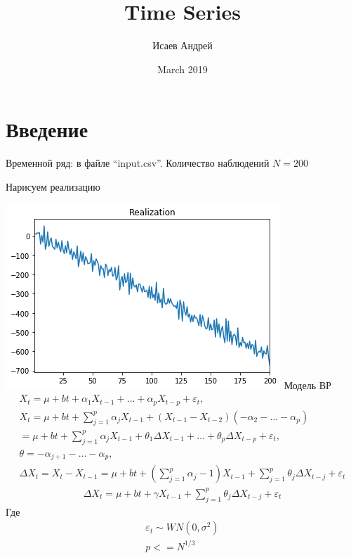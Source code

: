 \documentclass{article}
\title{Time Series}
\author{Исаев Андрей }
\date{March 2019}
\begin{document}
\maketitle

\section{Введение}
Временной ряд: в файле ``input.csv''. Количество наблюдений $N=200$

Нарисуем реализацию

\includegraphics[width=\linewidth]{image.png}
Модель ВР \begin{gather*}
    X_t = \mu + bt +\alpha_1X_{t-1} + \ldots + \alpha_p X_{t-p} + \varepsilon_t,\\
    X_t = \mu +bt +\sum_{j=1}^{p}\alpha_jX_{t-1} + (X_{t-1} - X_{t-2})(-\alpha_2-\ldots -\alpha_p)\\
    = \mu + bt +\sum_{j=1}^{p}\alpha_jX_{t-1} + \theta_1\Delta X_{t-1} + \ldots + \theta_p\Delta X_{t-p} +\varepsilon_t,\\ \theta= -\alpha_{j+1}-\ldots-\alpha_p,\\
    \Delta X_t=X_t - X_{t-1}=\mu+bt+(\sum_{j=1}^{p}\alpha_j-1)X_{t-1}+\sum_{j=1}^{p}\theta_j\Delta X_{t-j}+\varepsilon_t
\end{gather*}
\begin{gather}
    \Delta X_t = \mu +bt + \gamma X_{t-1} + \sum_{j=1}^{p}\theta_j \Delta X_{t-j} +\varepsilon_t
\end{gather}
Где 
\begin{gather*}
    \varepsilon_t \sim WN(0,\sigma^2)\\
    p <= N^{1/3}
\end{gather*}
\end{document}
